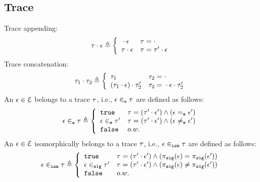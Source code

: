 %
\subsection{Trace}
Trace appending:
\[
  \trace \cdot \event \triangleq
  \left\{
  \begin{array}{ll} 
    {} \cdot \event           & \trace =  \cdot \\
    \trace \cdot \event    & \trace =  \trace' \cdot \event\\ 
  \end{array}
  \right.
\]
%
Trace concatenation:
\[
  \trace_1 \cdot \trace_2 \triangleq
  \left\{
  \begin{array}{ll} 
    \trace_1                                  & \trace_2 =  \cdot \\
    (\trace_1 \cdot \event) \cdot \trace_2'    & \trace_2 =  {} \cdot \event \cdot \trace_2'\\ 
  \end{array}
  \right.
\]
%
An $\mathtt{\epsilon} \in \mathcal{E}$ belongs to a trace $\mathtt{\tau}$, i.e., $\mathtt{\epsilon} \in_{\mathtt{e}} \mathtt{\tau}$ are defined as follows:
%
\begin{equation}
  \event \eventin \trace  
  \triangleq \left\{
  \begin{array}{ll} 
    \etrue                  & \trace =  (\trace' \cdot \event') \land (\event \eventeq \event') \\
    \event \eventin \trace' & \trace =  (\trace' \cdot \event') \land (\event \eventneq \event') \\ 
    \efalse                 & o.w.
  \end{array}
  \right.
\end{equation}
%
An $\mathtt{\epsilon} \in \mathcal{E}$ isomorphically belongs to a trace $\mathtt{\tau}$, i.e., $\mathtt{\epsilon} \in_{\mathtt{ism}} \mathtt{\tau}$ are defined as follows:
\begin{equation}
  \event \ismin \trace  
  \triangleq \left\{
  \begin{array}{ll} 
    \etrue                  & \trace =  (\trace' \cdot \event') 
    \land (\pi_{\sig}(\event) = \pi_{\sig}(\event')) \\
    \event \sigin \trace'   & \trace =  (\trace' \cdot \event') \land (\pi_{\sig}(\event) \neq \pi_{\sig}(\event') ) \\ 
    \efalse                 & o.w.
  \end{array}
  \right.
\end{equation}
%
%
%
